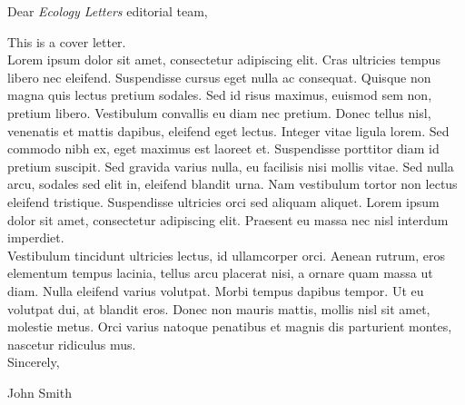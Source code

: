 \documentclass[davis,esp,12pt]{ucletter}
\begin{document}
\begin{letter}


\opening{Dear \textit{Ecology Letters} editorial team,}

This is a cover letter. \\

Lorem ipsum dolor sit amet, consectetur adipiscing elit. Cras ultricies tempus libero nec eleifend. Suspendisse cursus eget nulla ac consequat. Quisque non magna quis lectus pretium sodales. Sed id risus maximus, euismod sem non, pretium libero. Vestibulum convallis eu diam nec pretium. Donec tellus nisl, venenatis et mattis dapibus, eleifend eget lectus. Integer vitae ligula lorem. Sed commodo nibh ex, eget maximus est laoreet et. Suspendisse porttitor diam id pretium suscipit. Sed gravida varius nulla, eu facilisis nisi mollis vitae. Sed nulla arcu, sodales sed elit in, eleifend blandit urna. Nam vestibulum tortor non lectus eleifend tristique. Suspendisse ultricies orci sed aliquam aliquet. Lorem ipsum dolor sit amet, consectetur adipiscing elit. Praesent eu massa nec nisl interdum imperdiet.\\

Vestibulum tincidunt ultricies lectus, id ullamcorper orci. Aenean rutrum, eros elementum tempus lacinia, tellus arcu placerat nisi, a ornare quam massa ut diam. Nulla eleifend varius volutpat. Morbi tempus dapibus tempor. Ut eu volutpat dui, at blandit eros. Donec non mauris mattis, mollis nisl sit amet, molestie metus. Orci varius natoque penatibus et magnis dis parturient montes, nascetur ridiculus mus.\\


Sincerely,

John Smith


\end{letter}
\end{document}
